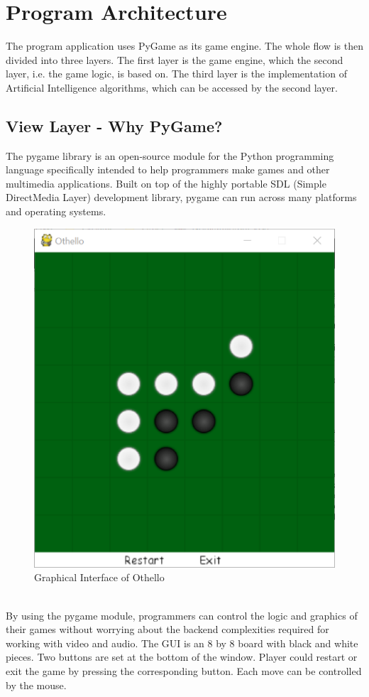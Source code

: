 \documentclass[letterpaper,12pt]{article}
\begin{document}
\section{Program Architecture}

The program application uses PyGame as its game engine. The whole flow is then divided into three layers. The first layer is the game engine, which the second layer, i.e. the game logic, is based on. The third layer is the implementation of Artificial Intelligence algorithms, which can be accessed by the second layer.

\subsection{View Layer - Why PyGame?}
The pygame library is an open-source module for the Python programming language specifically intended to help programmers make games and other multimedia applications. Built on top of the highly portable SDL (Simple DirectMedia Layer) development library, pygame can run across many platforms and operating systems.\\
\begin{figure}[!htb]
\centering
\includegraphics[scale=.3]{GUI.eps}
\caption{Graphical Interface of Othello}
\end{figure}\\
\noindent
By using the pygame module, programmers can control the logic and graphics of their games without worrying about the backend complexities required for working with video and audio.
\noindent
The GUI is an 8 by 8 board with black and white pieces. Two buttons are set at the bottom of the window. Player could restart or exit the game by pressing the corresponding button. Each move can be controlled by the mouse.
\end{document}
